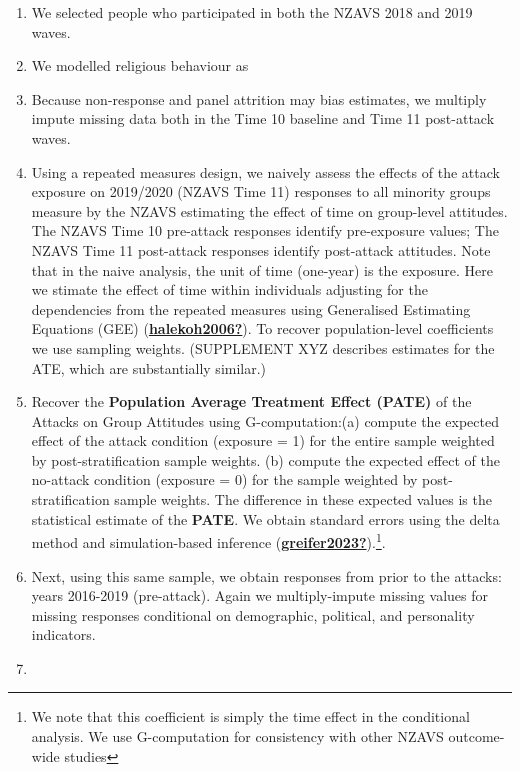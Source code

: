 \documentclass[
  singlecolumn]{report}
\providecommand{\tightlist}{%
  \setlength{\itemsep}{0pt}\setlength{\parskip}{0pt}}\usepackage{longtable,booktabs,array}
\begin{document}
\begin{enumerate}
\def\labelenumi{\arabic{enumi}.}
\tightlist
\item
  We selected people who participated in both the NZAVS 2018 and 2019
  waves.
\item
  We modelled religious behaviour as
\item
  Because non-response and panel attrition may bias estimates, we
  multiply impute missing data both in the Time 10 baseline and Time 11
  post-attack waves.
\item
  Using a repeated measures design, we naively assess the effects of the
  attack exposure on 2019/2020 (NZAVS Time 11) responses to all minority
  groups measure by the NZAVS estimating the effect of time on
  group-level attitudes. The NZAVS Time 10 pre-attack responses identify
  pre-exposure values; The NZAVS Time 11 post-attack responses identify
  post-attack attitudes. Note that in the naive analysis, the unit of
  time (one-year) is the exposure. Here we stimate the effect of time
  within individuals adjusting for the dependencies from the repeated
  measures using Generalised Estimating Equations (GEE)
  (\protect\hyperlink{ref-halekoh2006}{\textbf{halekoh2006?}}). To
  recover population-level coefficients we use sampling weights.
  (SUPPLEMENT XYZ describes estimates for the ATE, which are
  substantially similar.)
\item
  Recover the \textbf{Population Average Treatment Effect (PATE)} of the
  Attacks on Group Attitudes using G-computation:(a) compute the
  expected effect of the attack condition (exposure = 1) for the entire
  sample weighted by post-stratification sample weights. (b) compute the
  expected effect of the no-attack condition (exposure = 0) for the
  sample weighted by post-stratification sample weights. The difference
  in these expected values is the statistical estimate of the
  \textbf{PATE}. We obtain standard errors using the delta method and
  simulation-based inference
  (\protect\hyperlink{ref-greifer2023}{\textbf{greifer2023?}}).\footnote{We
    note that this coefficient is simply the time effect in the
    conditional analysis. We use G-computation for consistency with
    other NZAVS outcome-wide studies}.
\item
  Next, using this same sample, we obtain responses from prior to the
  attacks: years 2016-2019 (pre-attack). Again we multiply-impute
  missing values for missing responses conditional on demographic,
  political, and personality indicators.
\item

\end{enumerate}
\end{document}
